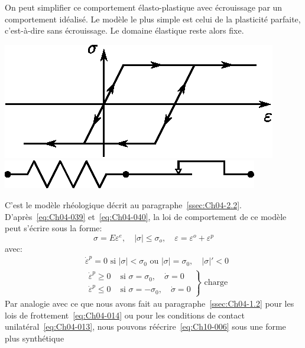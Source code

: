 On peut simplifier ce comportement élasto-plastique avec écrouissage par un 	comportement idéalisé.
Le modèle le plus simple est celui de la plasticité parfaite, c'est-à-dire sans écrouissage.
Le domaine élastique reste alors fixe.
\begin{center}
    \includegraphics{../images/T1_Ch10-03.eps}
    \includegraphics{../images/T1_Ch10-04.eps}
\end{center}
C'est le modèle rhéologique décrit au paragraphe~\ref{ssec:Ch04-2.2}.
D'après~\eqref{eq:Ch04-039} et~\eqref{eq:Ch04-040}, la loi de comportement de ce modèle peut s'écrire sous la forme: 
\begin{equation}
    \sigma = E \varepsilon^e, \quad |\sigma| \leq \sigma_o, \quad \varepsilon = \varepsilon^o + \varepsilon^p 
    \label{eq:Ch10-005}
\end{equation}
avec:
\begin{equation}
    \begin{aligned}
        &\dot{\varepsilon}^p = 0  \text{ si } |\sigma| < \sigma_0 \text{ ou } |\sigma| = \sigma_0,\quad |\sigma|' < 0 \\
        &\!\!\left.
        \begin{aligned}
            \dot{\varepsilon}^p \geq 0 & \text{ si } \sigma = \sigma_0,\quad \dot{\sigma} = 0 \\
            \dot{\varepsilon}^p \leq 0 & \text{ si } \sigma = - \sigma_0,\quad \dot{\sigma} = 0
        \end{aligned}
        \right\} \text{ charge}
    \end{aligned}
    \label{eq:Ch10-006}
\end{equation}
Par analogie avec ce que nous avons fait au paragraphe~\ref{ssec:Ch04-1.2} pour les lois de frottement~\eqref{eq:Ch04-014} ou pour les conditions de contact unilatéral~\eqref{eq:Ch04-013}, nous pouvons réécrire~\eqref{eq:Ch10-006} sous une forme plus synthétique 
